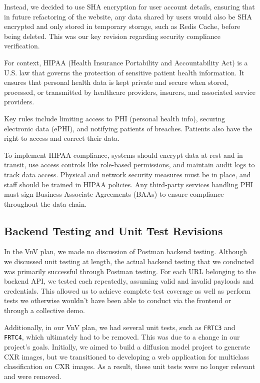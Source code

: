 \documentclass[12pt, titlepage]{article}
\begin{document}
\begin{enumerate}
  Instead, we decided to use SHA encryption for user account details, ensuring that in future refactoring of the website, any data shared by users would also be SHA encrypted and only stored in temporary storage, such as Redis Cache, before being deleted. This was our key revision regarding security compliance verification.

  For context, HIPAA (Health Insurance Portability and Accountability Act) is a U.S. law that governs the protection of sensitive patient health information. It ensures that personal health data is kept private and secure when stored, processed, or transmitted by healthcare providers, insurers, and associated service providers.

  Key rules include limiting access to PHI (personal health info), securing electronic data (ePHI), and notifying patients of breaches. Patients also have the right to access and correct their data.

  To implement HIPAA compliance, systems should encrypt data at rest and in transit, use access controls like role-based permissions, and maintain audit logs to track data access. Physical and network security measures must be in place, and staff should be trained in HIPAA policies. Any third-party services handling PHI must sign Business Associate Agreements (BAAs) to ensure compliance throughout the data chain.
  
  \subsection{Backend Testing and Unit Test Revisions}
  
  In the VnV plan, we made no discussion of Postman backend testing. Although we discussed unit testing at length, the actual backend testing that we conducted was primarily successful through Postman testing. For each URL belonging to the backend API, we tested each repeatedly, assuming valid and invalid payloads and credentials. This allowed us to achieve complete test coverage as well as perform tests we otherwise wouldn't have been able to conduct via the frontend or through a collective demo.
  
  Additionally, in our VnV plan, we had several unit tests, such as \texttt{FRTC3} and \texttt{FRTC4}, which ultimately had to be removed. This was due to a change in our project's goals. Initially, we aimed to build a diffusion model project to generate CXR images, but we transitioned to developing a web application for multiclass classification on CXR images. As a result, these unit tests were no longer relevant and were removed.
  

\end{enumerate}
\end{document}
